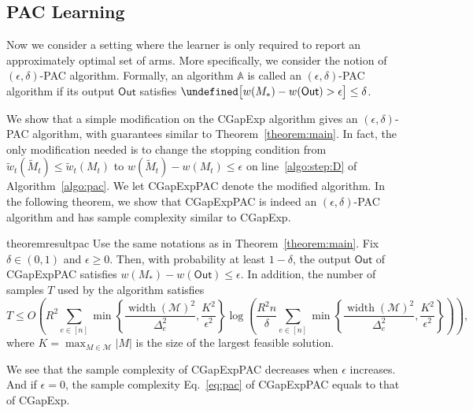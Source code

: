 \documentclass{article}
\newcommand{\Algorithm}{{\small \textsf{CGapExp}}\xspace}
\newcommand{\AlgorithmPAC}{{\small \textsf{CGapExpPAC}}\xspace}
\newcommand{\M}{\mathcal M}
\DeclareMathOperator{\rank}{width}
\newcommand{\out}{\mathsf{Out}}
\let\Pr\undefined
\DeclareMathOperator{\Pr}{Pr}
\begin{document}
\subsection{PAC Learning}
Now we consider a setting where the learner is only required to report an approximately optimal set of arms. 
More specifically, we consider the notion of $(\epsilon,\delta)$-PAC algorithm.
Formally, an algorithm $\mathbb A$ is called an $(\epsilon,\delta)$-PAC algorithm if its output $\out$ satisfies $\Pr\big[w(M_*)-w(\out) > \epsilon\big] \le \delta$.

We show that a simple modification on the \Algorithm algorithm gives an $(\epsilon,\delta)$-PAC algorithm, with guarantees similar  to Theorem~\ref{theorem:main}.
In fact, the only modification needed is to change the stopping condition from $\tilde w_t(\tilde M_t)\le \tilde w_t(M_t)$ to $w(\tilde M_t)-w(M_t) \le \epsilon$ on line~\ref{algo:step:D} of Algorithm~\ref{algo:pac}.
We let  \AlgorithmPAC denote the modified algorithm.
In the following theorem, we show that \AlgorithmPAC is indeed an $(\epsilon,\delta)$-PAC algorithm and has sample complexity similar to \Algorithm.
\begin{restatable}{theorem}{resultpac}
Use the same notations as in Theorem~\ref{theorem:main}.
Fix $\delta\in(0,1)$ and $\epsilon \ge 0$.
Then, with probability at least $1-\delta$, the output $\out$ of \AlgorithmPAC satisfies
$
w(M_*)-w(\out) \le \epsilon.
$
In addition, the number of samples $T$ used by the algorithm satisfies
\begin{equation}
T \le 
O\left(R^2\sum_{e\in [n]} \min\left\{\frac{\rank(\M)^2}{\Delta_e^2}, \frac{K^2}{\epsilon^2}\right\} 
\log\left(\frac{R^2n}\delta \sum_{e\in [n]} \min\left\{\frac{\rank(\M)^2}{\Delta_e^2}, \frac{K^2}{\epsilon^2}\right\}\right)\right),
\label{eq:pac}
\end{equation}
where $K=\max_{M\in \M} |M|$ is the size of the largest feasible solution.
\label{theorem:pac}
\end{restatable}
We see that the sample complexity of \AlgorithmPAC decreases when $\epsilon$ increases.
And if $\epsilon=0$, the sample complexity Eq.~\eqref{eq:pac} of \AlgorithmPAC equals to that of \Algorithm. 
\end{document}

